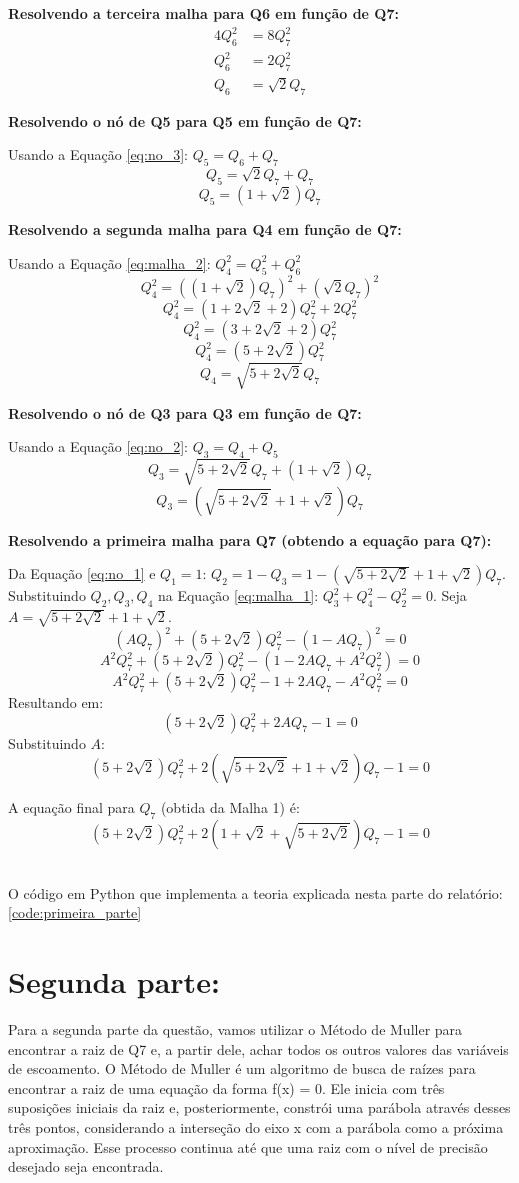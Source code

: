 \documentclass[12pt]{article}
\begin{document}
\textbf{Resolvendo a terceira malha para Q6 em função de Q7:}
\begin{align*}
4 Q_6^2 &= 8 Q_7^2 \\
Q_6^2 &= 2 Q_7^2 \\
Q_6 &= \sqrt{2} Q_7
\end{align*}

\textbf{Resolvendo o nó de Q5 para Q5 em função de Q7:}

Usando a Equação \eqref{eq:no_3}: $Q_5 = Q_6 + Q_7$
\[ Q_5 = \sqrt{2} Q_7 + Q_7 \]
\[ Q_5 = (1+\sqrt{2}) Q_7 \]

\textbf{Resolvendo a segunda malha para Q4 em função de Q7:}

Usando a Equação \eqref{eq:malha_2}: $Q_4^2 = Q_5^2 + Q_6^2$
\[ Q_4^2 = ((1+\sqrt{2})Q_7)^2 + (\sqrt{2}Q_7)^2 \]
\[ Q_4^2 = (1 + 2\sqrt{2} + 2)Q_7^2 + 2Q_7^2 \]
\[ Q_4^2 = (3 + 2\sqrt{2} + 2)Q_7^2 \]
\[ Q_4^2 = (5+2\sqrt{2})Q_7^2 \]
\[ Q_4 = \sqrt{5+2\sqrt{2}} Q_7 \]

\textbf{Resolvendo o nó de Q3 para Q3 em função de Q7:}

Usando a Equação \eqref{eq:no_2}: $Q_3 = Q_4 + Q_5$
\[ Q_3 = \sqrt{5+2\sqrt{2}}Q_7 + (1+\sqrt{2})Q_7 \]
\[ Q_3 = (\sqrt{5+2\sqrt{2}} + 1+\sqrt{2}) Q_7 \]

\textbf{Resolvendo a primeira malha para Q7 (obtendo a equação para Q7):}

Da Equação \eqref{eq:no_1} e $Q_1=1$: $Q_2 = 1 - Q_3 = 1 - (\sqrt{5+2\sqrt{2}} + 1+\sqrt{2}) Q_7$.
Substituindo $Q_2, Q_3, Q_4$ na Equação \eqref{eq:malha_1}: $Q_3^2 + Q_4^2 - Q_2^2 = 0$.
Seja $A = \sqrt{5+2\sqrt{2}} + 1+\sqrt{2}$.
\[ (A Q_7)^2 + (5+2\sqrt{2})Q_7^2 - (1 - A Q_7)^2 = 0 \]
\[ A^2 Q_7^2 + (5+2\sqrt{2})Q_7^2 - (1 - 2AQ_7 + A^2 Q_7^2) = 0 \]
\[ A^2 Q_7^2 + (5+2\sqrt{2})Q_7^2 - 1 + 2AQ_7 - A^2 Q_7^2 = 0 \]
Resultando em:
\[ (5+2\sqrt{2})Q_7^2 + 2AQ_7 - 1 = 0 \]
Substituindo $A$:
\[ (5+2\sqrt{2})Q_7^2 + 2(\sqrt{5+2\sqrt{2}} + 1+\sqrt{2})Q_7 - 1 = 0 \]

A equação final para $Q_7$ (obtida da Malha 1) é:
\[ \boxed{(5+2\sqrt{2})Q_7^2 + 2(1+\sqrt{2} + \sqrt{5+2\sqrt{2}})Q_7 - 1 = 0} \]

\\
O código em Python que implementa a teoria explicada nesta parte do relatório: \ref{code:primeira_parte}
\section*{Segunda parte:}
Para a segunda parte da questão, vamos utilizar o Método de Muller para encontrar a raiz de Q7 e, a partir dele, achar todos os outros valores das variáveis de escoamento. 
O Método de Muller é um algoritmo de busca de raízes para encontrar a raiz de uma equação da forma f(x) = 0. Ele inicia com três suposições iniciais da raiz e, posteriormente, constrói uma parábola através desses três pontos, considerando a interseção do eixo x com a parábola como a próxima aproximação. Esse processo continua até que uma raiz com o nível de precisão desejado seja encontrada.
\end{document}
